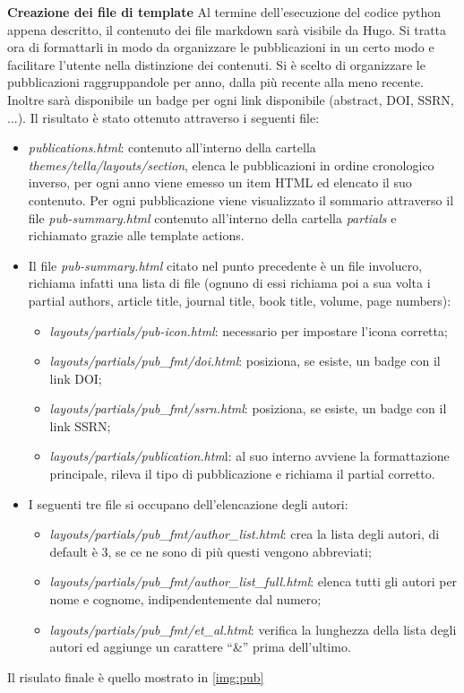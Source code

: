 \documentclass[target=bach,aauheader=]{thud}
\begin{document}
\textbf{{\fontsize{12}{14}\selectfont Creazione dei file di template}}
\newline \newline
Al termine dell'esecuzione del codice python appena descritto, il contenuto dei file markdown sarà visibile da Hugo. Si tratta ora di formattarli in modo da organizzare le pubblicazioni in un certo modo e facilitare l'utente nella distinzione dei contenuti.
\newline
Si è scelto di organizzare le pubblicazioni raggruppandole per anno, dalla più recente alla meno recente. Inoltre sarà disponibile un badge per ogni link disponibile (abstract, DOI, SSRN, ...). Il risultato è stato ottenuto attraverso i seguenti file:
\begin{itemize}
    \item \textit{publications.html}: contenuto all'interno della cartella \textit{themes/tella/layouts/section}, elenca le pubblicazioni in ordine cronologico inverso, per ogni anno viene emesso un item HTML ed elencato il suo contenuto. 
    \newline
    Per ogni pubblicazione viene visualizzato il sommario attraverso il file \textit{pub-summary.html} contenuto all'interno della cartella \textit{partials} e richiamato grazie alle template actions.
    \item Il file \textit{pub-summary.html} citato nel punto precedente è un file involucro, richiama infatti una lista di file (ognuno di essi richiama poi a sua volta i partial authors, article title, journal title, book title, volume, page numbers):
    \begin{itemize}
        \item \textit{layouts/partials/pub-icon.html}: necessario per impostare l'icona corretta;
        \item \textit{layouts/partials/pub\_fmt/doi.html}: posiziona, se esiste, un badge con il link DOI;
        \item \textit{layouts/partials/pub\_fmt/ssrn.html}: posiziona, se esiste, un badge con il link SSRN;
        \item \textit{layouts/partials/publication.htm}l: al suo interno avviene la formattazione principale, rileva il tipo di pubblicazione e richiama il partial corretto.
    \end{itemize}
    \item I seguenti tre file si occupano dell'elencazione degli autori: 
    \begin{itemize}
        \item \textit{layouts/partials/pub\_fmt/author\_list.html}: crea la lista degli autori, di default è 3, se ce ne sono di più questi vengono abbreviati;
        \item \textit{layouts/partials/pub\_fmt/author\_list\_full.html}: elenca tutti gli autori per nome e cognome, indipendentemente dal numero;
        \item \textit{layouts/partials/pub\_fmt/et\_al.html}: verifica la lunghezza della lista degli autori ed aggiunge un carattere “\&” prima dell'ultimo.
    \end{itemize}
\end{itemize}
Il risulato finale è quello mostrato in \cref{img:pub}
\end{document}
